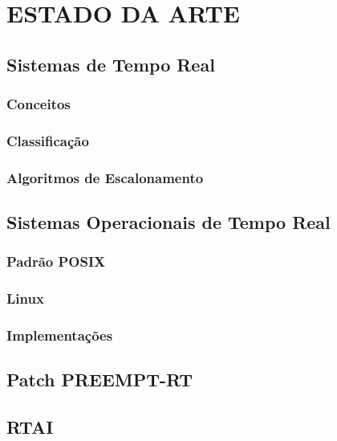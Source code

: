 \chapter{ESTADO DA ARTE}
\label{cap:estadoarte}

\section{Sistemas de Tempo Real}
\subsection{Conceitos}
\subsection{Classificação}
\subsection{Algoritmos de Escalonamento}

\section{Sistemas Operacionais de Tempo Real}
\subsection{Padrão POSIX}
\subsection{Linux}
\subsection{Implementações}

\section{Patch PREEMPT-RT}

\section{RTAI}

